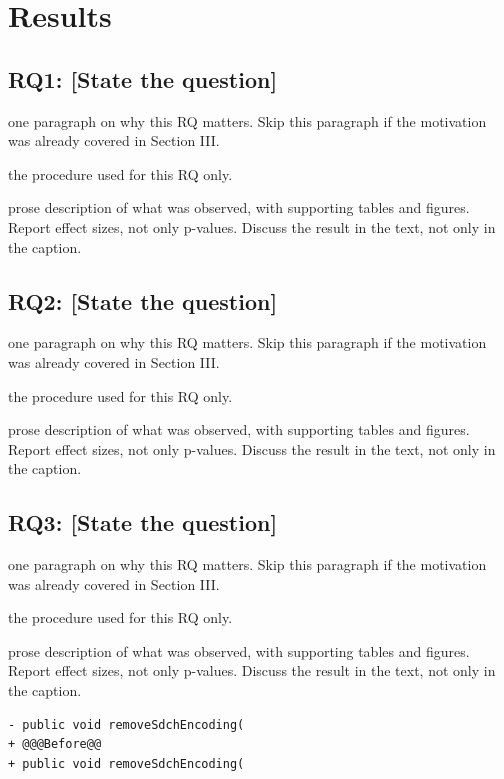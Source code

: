 \section{Results}
 
\subsection{RQ1: [State the question]}
\motivation 
one paragraph on why this RQ matters. Skip this paragraph
if the motivation was already covered in Section III.

\approach 
the procedure used for this RQ only.

\results
prose description of what was observed, with supporting tables
and figures. Report effect sizes, not only p-values. Discuss the result
in the text, not only in the caption.
 
\subsection{RQ2: [State the question]}
\motivation 
one paragraph on why this RQ matters. Skip this paragraph
if the motivation was already covered in Section III.

\approach 
the procedure used for this RQ only.

\results
prose description of what was observed, with supporting tables
and figures. Report effect sizes, not only p-values. Discuss the result
in the text, not only in the caption.

 
\subsection{RQ3: [State the question]}
\motivation 
one paragraph on why this RQ matters. Skip this paragraph
if the motivation was already covered in Section III.

\approach 
the procedure used for this RQ only.

\results
prose description of what was observed, with supporting tables
and figures. Report effect sizes, not only p-values. Discuss the result
in the text, not only in the caption.

 \begin{lstlisting}[caption=``Change Return Type'' refactoring causing a compiler error, label=sni_compile_error]
- public void removeSdchEncoding(
+ @@@Before@@
+ public void removeSdchEncoding(
 \end{lstlisting}



 \clearpage